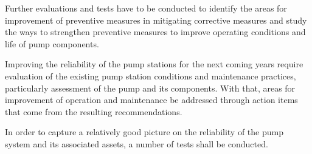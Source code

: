 


Further evaluations and tests have to be conducted to identify the areas for improvement of preventive measures in mitigating corrective measures and study the ways to strengthen preventive measures to improve operating conditions and life of pump components. 

Improving the reliability of the pump stations for the next coming years require evaluation of the existing pump station conditions and maintenance practices, particularly assessment of the pump and its components. With that, areas for improvement of operation and maintenance be addressed through action items that come from the resulting recommendations.

In order to capture a relatively good picture on the reliability of the pump system and its associated assets, a number of tests shall be conducted. 

